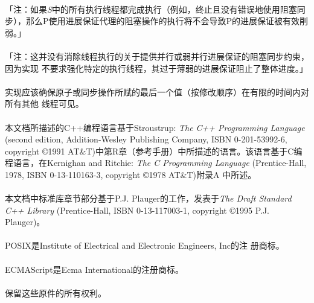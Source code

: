 \paragraph{}
「注：如果\textit{S}中的所有执行线程都完成执行（例如，终止且没有错误地使用阻塞同
步），那么P使用进展保证代理的阻塞操作的执行将不会导致P的进展保证被有效削弱。」

\paragraph{}
「注：这并没有消除线程执行的关于提供并行或弱并行进展保证的阻塞同步约束，因为实现
不要求强化特定的执行线程，其过于薄弱的进展保证阻止了整体进度。」

\paragraph{}
实现应该确保原子或同步操作所赋的最后一个值（按修改顺序）在有限的时间内对所有其他
线程可见。

\paragraph{}
本文档所描述的C++编程语言基于Stroustrup: \textit{The C++ Programming Language}
(second edition, Addition-Wesley Publishing Company, ISBN 0-201-53992-6,
copyright \copyright 1991 AT\&T)中第R章（参考手册）中所描述的语言。该语言基于C编
程语言，在Kernighan and Ritchie: \textit{The C Programming Language}
(Prentice-Hall, 1978, ISBN 0-13-110163-3, copyright \copyright 1978 AT\&T)附录A
中所述。

\paragraph{}
本文档中标准库章节部分基于P.J. Plauger的工作，发表于\textit{The Draft Standard
C++ Library} (Prentice-Hall, ISBN 0-13-117003-1, copyright \copyright 1995 P.J.
Plauger)。

\paragraph{}
POSIX\textregistered 是Institute of Electrical and Electronic Engineers, Inc的注
册商标。

\paragraph{}
ECMAScript\textregistered 是Ecma International的注册商标。

\paragraph{}
保留这些原件的所有权利。
